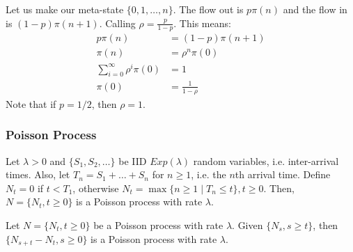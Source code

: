 Let us make our meta-state $\{0, 1, \dots, n\}$. The flow out is $p \pi(n)$ and the flow in is $(1- p) \pi(n + 1)$. Calling
$\rho = \frac{p}{1-p}$. This means:
\begin{align*}
    p \pi(n) &= (1 - p) \pi(n + 1) \\
    \pi(n) &= \rho^n \pi(0) \\
    \sum_{i = 0}^{\infty} \rho^i \pi(0) &= 1 \\
    \pi(0) &= \frac{1}{1 - \rho}
\end{align*}
Note that if $p = 1/2$, then $\rho = 1$.

\subsubsection{Poisson Process}

\begin{definition}
    Let $\lambda > 0$ and $\{S_1, S_2, \dots \}$ be IID $Exp(\lambda)$ random variables, i.e. inter-arrival times.
    Also, let $T_n = S_1 + \dots + S_n$
    for $n \geq 1$, i.e. the $n$th arrival time. Define $N_t = 0$ if $t < T_1$, otherwise $N_t = \max\{n \geq 1 \mid T_n \leq t\}, t \geq 0$.
    Then, $N = \{N_t, t \geq 0\}$ is a Poisson process with rate $\lambda$.
\end{definition}

\begin{theorem}
    Let $N = \{N_t, t \geq 0\}$ be a Poisson process with rate $\lambda$. Given $\{N_s, s \geq t\}$, then
    $\{N_{s + t} - N_t, s \geq 0\}$ is a Poisson process with rate $\lambda$.
\end{theorem}